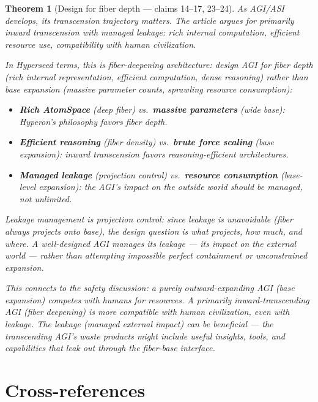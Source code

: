 \documentclass[11pt,a4paper]{article}
\newtheorem{theorem}[definition]{Theorem}
\begin{document}
\begin{theorem}[Design for fiber depth --- claims 14--17, 23--24]
\label{thm:agi}
As AGI/ASI develops, its transcension trajectory matters. The article
argues for primarily inward transcension with managed leakage: rich
internal computation, efficient resource use, compatibility with human
civilization.

In Hyperseed terms, this is \emph{fiber-deepening architecture}:
design AGI for fiber depth (rich internal representation, efficient
computation, dense reasoning) rather than base expansion (massive
parameter counts, sprawling resource consumption):
\begin{itemize}
\item \textbf{Rich AtomSpace} (deep fiber) vs.\ \textbf{massive
  parameters} (wide base): Hyperon's philosophy favors fiber depth.
\item \textbf{Efficient reasoning} (fiber density) vs.\ \textbf{brute
  force scaling} (base expansion): inward transcension favors
  reasoning-efficient architectures.
\item \textbf{Managed leakage} (projection control) vs.\ \textbf{resource
  consumption} (base-level expansion): the AGI's impact on the outside
  world should be managed, not unlimited.
\end{itemize}

Leakage management is \emph{projection control}: since leakage is
unavoidable (fiber always projects onto base), the design question
is what projects, how much, and where. A well-designed AGI manages
its leakage --- its impact on the external world --- rather than
attempting impossible perfect containment or unconstrained expansion.

This connects to the safety discussion: a purely outward-expanding
AGI (base expansion) competes with humans for resources. A primarily
inward-transcending AGI (fiber deepening) is more compatible with
human civilization, even with leakage. The leakage (managed external
impact) can be beneficial --- the transcending AGI's waste products
might include useful insights, tools, and capabilities that leak
out through the fiber-base interface.
\end{theorem}

\section{Cross-references}
\end{document}
